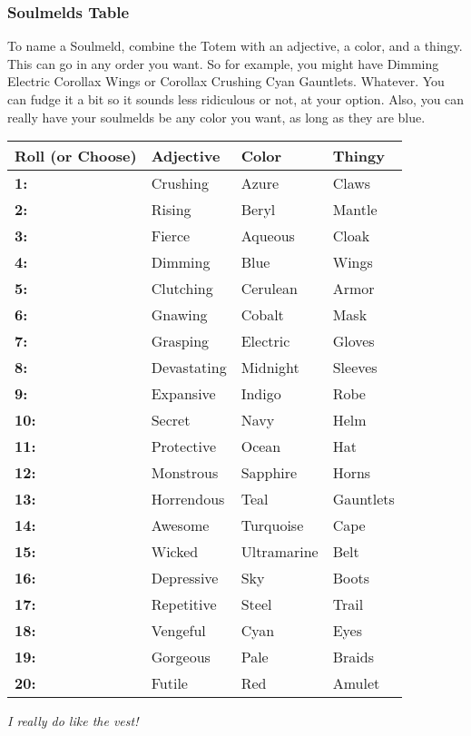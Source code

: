 

\subsubsection*{Soulmelds Table}
To name a Soulmeld, combine the Totem with an adjective, a color, and a thingy. This can go in any order you want. So for example, you might have Dimming Electric Corollax Wings or Corollax Crushing Cyan Gauntlets. Whatever. You can fudge it a bit so it sounds less ridiculous or not, at your option. Also, you can really have your soulmelds be any color you want, as long as they are blue.

\noindent\begin{tabular}[h]{|l|l|l|l|}
\hline
\textbf{Roll (or Choose)}&\textbf{Adjective}&\textbf{Color}&\textbf{Thingy}\\
\hline
\textbf{1:}&Crushing&Azure&Claws\\
\hline
\textbf{2:}&Rising&Beryl&Mantle\\
\hline
\textbf{3:}&Fierce&Aqueous&Cloak\\
\hline
\textbf{4:}&Dimming&Blue&Wings\\
\hline
\textbf{5:}&Clutching&Cerulean&Armor\\
\hline
\textbf{6:}&Gnawing&Cobalt&Mask\\
\hline
\textbf{7:}&Grasping&Electric&Gloves\\
\hline
\textbf{8:}&Devastating&Midnight&Sleeves\\
\hline
\textbf{9:}&Expansive&Indigo&Robe\\
\hline
\textbf{10:}&Secret&Navy&Helm\\
\hline
\textbf{11:}&Protective&Ocean&Hat\\
\hline
\textbf{12:}&Monstrous&Sapphire&Horns\\
\hline
\textbf{13:}&Horrendous&Teal&Gauntlets\\
\hline
\textbf{14:}&Awesome&Turquoise&Cape\\
\hline
\textbf{15:}&Wicked&Ultramarine&Belt\\
\hline
\textbf{16:}&Depressive&Sky&Boots\\
\hline
\textbf{17:}&Repetitive&Steel&Trail\\
\hline
\textbf{18:}&Vengeful&Cyan&Eyes\\
\hline
\textbf{19:}&Gorgeous&Pale&Braids\\
\hline
\textbf{20:}&Futile&Red&Amulet\\
\hline
\end{tabular}

\emph{I really do like the vest!}